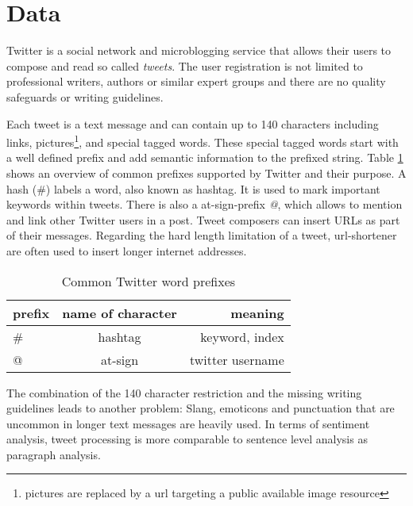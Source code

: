 \section{Data}
Twitter is a social network and microblogging service that
allows their users to compose and read so called 
\emph{tweets}. The user registration is not limited
to professional writers, authors or similar expert groups 
and there are no quality safeguards or writing guidelines. 

Each tweet is a text message and can contain up to 140 characters
including links, pictures\footnote{pictures are replaced 
by a url targeting a public available image resource}, and special tagged words.
These special tagged words start with a well defined prefix 
and add semantic information to the prefixed string.
Table \ref{tab:twitterprefixes} shows an overview of 
common prefixes supported by Twitter and their purpose. 
A hash (\#) labels a word, also known as hashtag.
It is used to mark important keywords within tweets.
There is also a at-sign-prefix \emph{@}, which allows 
to mention and link other Twitter users in a post. Tweet composers can 
insert URLs as part of their messages. Regarding the hard 
length limitation of a tweet, url-shortener are often used to
insert longer internet addresses.

\begin{table}[H]
\centering
\begin{tabular}{ l | c | r }                 
  prefix & name of character & meaning  \\
  \hline
  \# &  hashtag & keyword, index \\
  @ & at-sign & twitter username \\
  \hline
\end{tabular}
\caption{Common Twitter word prefixes}
\label{tab:twitterprefixes}
\end{table}

The combination of the 140 character restriction and
the missing writing guidelines leads to another problem: 
Slang, emoticons and punctuation that are uncommon in longer 
text messages are heavily used.\autocite{davies2011}
In terms of sentiment analysis, tweet processing is more comparable to
sentence level analysis as paragraph analysis. 

